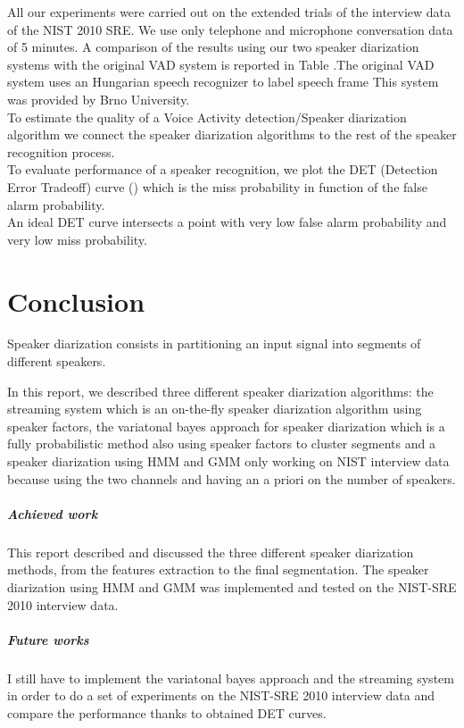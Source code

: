 \documentclass{techrep} %
\begin{document}
All our experiments were carried out on the extended trials of the
interview data of the NIST 2010 SRE. We use only telephone and
microphone conversation data of 5 minutes. A comparison of the results
using our two speaker diarization systems with the original VAD system
is reported in Table %
.The original VAD system uses
an Hungarian speech recognizer to label speech frame
This system was provided by Brno University.\\

To estimate the quality of a Voice Activity detection/Speaker
diarization algorithm we connect the speaker diarization algorithms to
the rest of the speaker recognition process.\\ To evaluate performance
of a speaker recognition, we plot the DET (Detection Error Tradeoff)
curve (\cite{DET}) which is the miss probability in function of the
false alarm probability.\\ An ideal DET curve intersects a point with
very low false alarm probability and very low miss probability.


\chapter{Conclusion}

Speaker diarization consists in partitioning an input signal into
segments of different speakers.

In this report, we described three different speaker diarization
algorithms: the streaming system which is an on-the-fly speaker
diarization algorithm using speaker factors, the variatonal bayes
approach for speaker diarization which is a fully probabilistic method
also using speaker factors to cluster segments and a speaker
diarization using HMM and GMM only working on NIST interview data
because using the two channels and having an a priori on the number of
speakers.

\paragraph{Achieved work} This report described and discussed the three different speaker diarization methods, from the features extraction to the final segmentation. The speaker diarization using HMM and GMM was implemented and tested on the NIST-SRE 2010 interview data.

\paragraph{Future works} I still have to implement the variatonal bayes approach and the streaming system in order to do a set of experiments on the NIST-SRE 2010 interview data and compare the performance thanks to obtained DET curves.

 \nocite{*}
\end{document}
